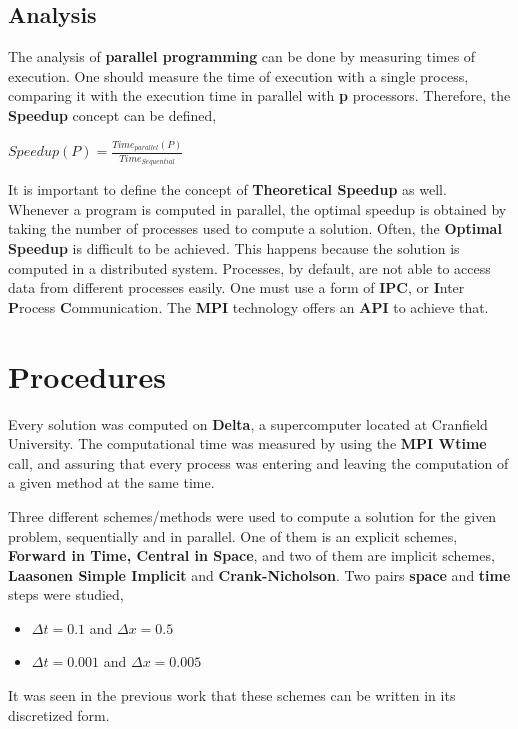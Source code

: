 \documentclass[12pt]{article}
\begin{document}
\subsection*{Analysis}
\par The analysis of \textbf{parallel programming} can be done by measuring times of execution. One should measure the time of execution with a single process, comparing it with the execution time in parallel with \textbf{p} processors. Therefore, the \textbf{Speedup} concept can be defined\cite{speedup},
\newline
\begin{center}
$
	Speedup(P) = \frac{Time_{parallel}(P)}{Time_{Sequential}}
$
\end{center}
\hfill
\par It is important to define the concept of \textbf{Theoretical Speedup} as well. Whenever a program is computed in parallel, the optimal speedup is obtained by taking the number of processes used to compute a solution. Often, the \textbf{Optimal Speedup} is difficult to be achieved. This happens because the solution is computed in a distributed system. Processes, by default, are not able to access data from different processes easily. One must use a form of \textbf{IPC}, or \textbf{I}nter \textbf{P}rocess \textbf{C}ommunication. The \textbf{MPI} technology offers an \textbf{API} to achieve that. 

\section*{Procedures}

\par Every solution was computed on \textbf{Delta}, a supercomputer located at Cranfield University. The computational time was measured by using the \textbf{MPI Wtime} call, and assuring that every process was entering and leaving the computation of a given method at the same time. 
\par Three different schemes/methods were used to compute a solution for the given problem, sequentially and in parallel. One of them is an explicit schemes, \textbf{Forward in Time, Central in Space}, and two of them are implicit schemes, \textbf{Laasonen Simple Implicit} and \textbf{Crank-Nicholson}. Two pairs \textbf{space} and \textbf{time} steps were studied,
\begin{itemize}[noitemsep] 
\item $ \Delta t = 0.1 $ and $ \Delta x = 0.5$
\item $ \Delta t = 0.001 $ and $ \Delta x = 0.005$
\end{itemize}
It was seen in the previous work\cite{fraga} that these schemes can be written in its discretized form.
\end{document}
